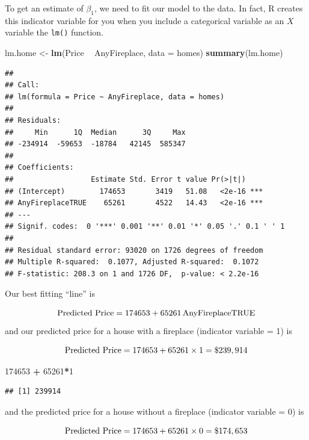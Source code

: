 \documentclass[
]{book}
\newenvironment{Shaded}{\begin{snugshade}}{\end{snugshade}}
\newcommand{\DataTypeTok}[1]{\textcolor[rgb]{0.13,0.29,0.53}{#1}}
\newcommand{\DecValTok}[1]{\textcolor[rgb]{0.00,0.00,0.81}{#1}}
\newcommand{\KeywordTok}[1]{\textcolor[rgb]{0.13,0.29,0.53}{\textbf{#1}}}
\newcommand{\NormalTok}[1]{#1}
\newcommand{\OperatorTok}[1]{\textcolor[rgb]{0.81,0.36,0.00}{\textbf{#1}}}
\newcommand{\StringTok}[1]{\textcolor[rgb]{0.31,0.60,0.02}{#1}}
\begin{document}
To get an estimate of \(\beta_1\), we need to fit our model to the data. In fact, R creates this indicator variable for you when you include a categorical variable as an \(X\) variable the \texttt{lm()} function.

\begin{Shaded}
\begin{Highlighting}[]
\NormalTok{lm.home <-}\StringTok{ }\KeywordTok{lm}\NormalTok{(Price }\OperatorTok{~}\StringTok{ }\NormalTok{AnyFireplace, }\DataTypeTok{data =}\NormalTok{ homes)}
\KeywordTok{summary}\NormalTok{(lm.home)}
\end{Highlighting}
\end{Shaded}

\begin{verbatim}
## 
## Call:
## lm(formula = Price ~ AnyFireplace, data = homes)
## 
## Residuals:
##     Min      1Q  Median      3Q     Max 
## -234914  -59653  -18784   42145  585347 
## 
## Coefficients:
##                  Estimate Std. Error t value Pr(>|t|)    
## (Intercept)        174653       3419   51.08   <2e-16 ***
## AnyFireplaceTRUE    65261       4522   14.43   <2e-16 ***
## ---
## Signif. codes:  0 '***' 0.001 '**' 0.01 '*' 0.05 '.' 0.1 ' ' 1
## 
## Residual standard error: 93020 on 1726 degrees of freedom
## Multiple R-squared:  0.1077,	Adjusted R-squared:  0.1072 
## F-statistic: 208.3 on 1 and 1726 DF,  p-value: < 2.2e-16
\end{verbatim}

Our best fitting ``line'' is

\[ \hbox{Predicted Price} = 174653 + 65261\,\hbox{AnyFireplaceTRUE} \]
and our predicted price for a house with a fireplace (indicator variable = 1) is

\[ \hbox{Predicted Price} = 174653 + 65261 \times 1 = \$ 239,914 \]

\begin{Shaded}
\begin{Highlighting}[]
\DecValTok{174653} \OperatorTok{+}\StringTok{ }\DecValTok{65261}\OperatorTok{*}\DecValTok{1}
\end{Highlighting}
\end{Shaded}

\begin{verbatim}
## [1] 239914
\end{verbatim}

and the predicted price for a house without a fireplace (indicator variable = 0) is

\[\hbox{Predicted Price} = 174653 + 65261 \times 0 = \$ 174,653\]
\end{document}
